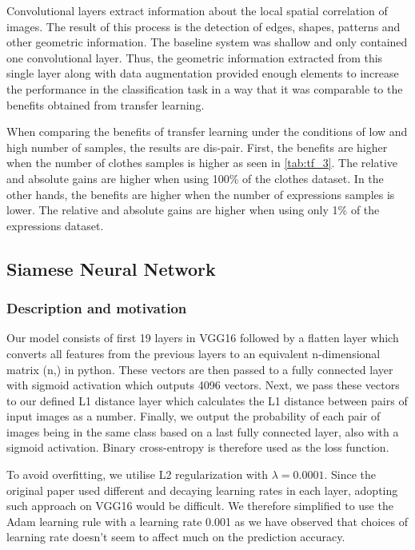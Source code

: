 \documentclass{article}
\begin{document}
Convolutional layers extract information about the local spatial correlation of images. The result of this process is the detection of edges, shapes, patterns and other geometric information. The baseline system was shallow and only contained one convolutional layer. Thus, the geometric information extracted from this single layer along with data augmentation provided enough elements to increase the performance in the classification task in a way that it was comparable to the benefits obtained from transfer learning. 

When comparing the benefits of transfer learning under the conditions of low and high number of samples, the results are dis-pair. First, the benefits are higher when the number of clothes samples is higher as seen in \ref{tab:tf_3}. The relative and absolute gains are higher when using 100\% of the clothes dataset. In the other hands, the benefits are higher when the number of expressions samples is lower. The relative and absolute gains are higher when using only 1\% of the expressions dataset.

\subsection{Siamese Neural Network}

\subsubsection{\textbf{Description and motivation}}

Our model consists of first 19 layers in VGG16 followed by a flatten layer which converts all features from the previous layers to
an equivalent n-dimensional matrix (n,) in python. These vectors are then passed to a fully connected layer with sigmoid activation which outputs 4096 vectors. Next, we pass these vectors to our defined L1 distance layer which calculates the L1 distance between pairs of input images as a number. Finally, we output the probability of each pair of images being in the same class based on a last fully connected layer, also with a sigmoid activation. Binary cross-entropy is therefore used as the loss function.

To avoid overfitting, we utilise L2 regularization with $\lambda=0.0001$. Since the original paper used different and decaying learning rates in each layer, adopting such approach on VGG16 would be difficult. We therefore simplified to use the Adam learning rule with a learning rate 0.001 as we have observed that choices of learning rate doesn't seem to affect much on the prediction accuracy.
\end{document}
